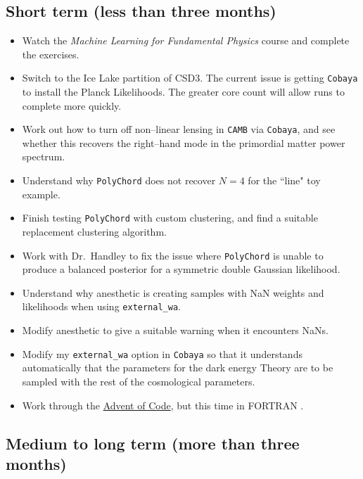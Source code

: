 \documentclass{article}
\begin{document}
\subsection{Short term (less than three months)}
\begin{itemize}
  \item Watch the \textit{Machine Learning for Fundamental Physics} course and complete the exercises.
  \item Switch to the Ice Lake partition of CSD3. The current issue is getting \texttt{Cobaya} to install the Planck Likelihoods. The greater core count will allow runs to complete more quickly.
  \item Work out how to turn off non--linear lensing in \texttt{CAMB} via \texttt{Cobaya}, and see whether this recovers the right--hand mode in the primordial matter power spectrum. 
  \item Understand why \texttt{PolyChord} does not recover $N=4$ for the ``line" toy example.
  \item Finish testing \texttt{PolyChord} with custom clustering, and find a suitable replacement clustering algorithm.
  \item Work with Dr.~Handley to fix the issue where \texttt{PolyChord} is unable to produce a balanced posterior for a symmetric double Gaussian likelihood.
  \item Understand why anesthetic is creating samples with NaN weights and likelihoods when using \newline \texttt{external\_wa}.
  \item Modify anesthetic to give a suitable warning when it encounters NaNs.
  \item Modify my \texttt{external\_wa} option in \texttt{Cobaya} so that it understands automatically that the parameters for the dark energy Theory are to be sampled with the rest of the cosmological parameters.
  \item Work through the \href{https://adventofcode.com}{Advent of Code}, but this time in FORTRAN \cite{advent}.
\end{itemize}
\subsection{Medium to long term (more than three months)}

\subsubsection{}
\end{document}
